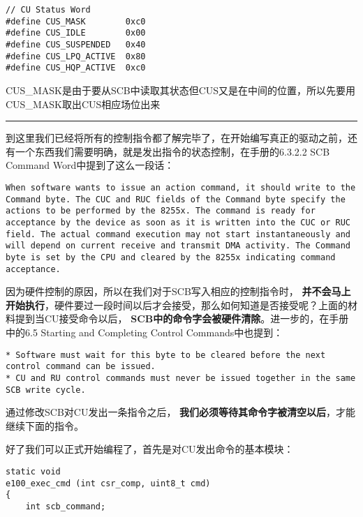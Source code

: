 \documentclass{article}
\newcommand{\highlight}[1]{{\bfseries \color{red}  #1}}
\begin{document}
\begin{CJK*}{UTF8}{gkai}
\begin{description}
\begin{lstlisting}[style=ccode, title={\scriptsize \ttfamily \bfseries kern/e100.h}]
// CU Status Word
#define CUS_MASK        0xc0
#define CUS_IDLE        0x00
#define CUS_SUSPENDED   0x40
#define CUS_LPQ_ACTIVE  0x80
#define CUS_HQP_ACTIVE  0xc0
\end{lstlisting}

CUS\_MASK是由于要从SCB中读取其状态但CUS又是在中间的位置，所以先要用CUS\_MASK取出CUS相应场位出来

\end{description}


\vspace{2em}
\hrule
\vspace{2em}

到这里我们已经将所有的控制指令都了解完毕了，在开始编写真正的驱动之前，还有一个东西我们需要明确，就是发出指令的状态控制，在手册的6.3.2.2 SCB Command Word中提到了这么一段话：

\begin{lstlisting}[style=challenge]
When software wants to issue an action command, it should write to the Command byte. The CUC and RUC fields of the Command byte specify the actions to be performed by the 8255x. The command is ready for acceptance by the device as soon as it is written into the CUC or RUC field. The actual command execution may not start instantaneously and will depend on current receive and transmit DMA activity. The Command byte is set by the CPU and cleared by the 8255x indicating command acceptance.
\end{lstlisting}

因为硬件控制的原因，所以在我们对于SCB写入相应的控制指令时，\highlight{并不会马上开始执行}，硬件要过一段时间以后才会接受，那么如何知道是否接受呢？上面的材料提到当CU接受命令以后，\highlight{SCB中的命令字会被硬件清除}。进一步的，在手册中的6.5 Starting and Completing Control Commands中也提到：

\begin{lstlisting}[style=challenge]
* Software must wait for this byte to be cleared before the next control command can be issued.
* CU and RU control commands must never be issued together in the same SCB write cycle.
\end{lstlisting}

通过修改SCB对CU发出一条指令之后，\highlight{我们必须等待其命令字被清空以后}，才能继续下面的指令。

好了我们可以正式开始编程了，首先是对CU发出命令的基本模块：

\begin{lstlisting}[style=ccode, title={\scriptsize \ttfamily \bfseries kern/e100.c: e100\_exec\_cmd()}]
static void
e100_exec_cmd (int csr_comp, uint8_t cmd)
{
    int scb_command;


\end{lstlisting}
\end{CJK*}
\end{document}
